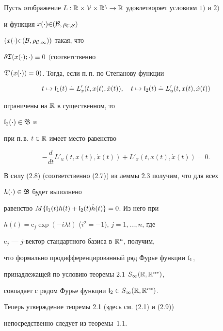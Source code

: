 \begin{thms}


Пусть отображение $L:\Bbb R\times\cal V\times\Bbb R^n


\to\Bbb R$ удовлетворяет условиям $1)$ и $2)$ 


и функция $x(\cdot){\in}(\cal B,\rho_{C,S})$


$(x(\cdot){\in}(\cal B,\rho_{C,\infty}))$ такая, что


$\delta\frak T(x(\cdot);\cdot)\equiv 0$ $($соответственно


$\frak T'(x(\cdot))=0)$. Тогда, если п.\,п. по Степанову функции


\begin{equation}


t\mapsto\frak l_1(t)\doteq L'_x(t, x(t),\Dot x(t)),


\quad t\mapsto\frak l_2(t)\doteq L'_u(t, x(t),\Dot x(t))


\end{equation}


ограничены на $\Bbb R$ в существенном, то


$\frak l_2(\cdot)\in\frak B$ и


при п.\,в. $t\in\Bbb R$ имеет место равенство


\begin{equation}


-\frac{d}{dt}L'_u(t, x(t),\Dot x(t))+L'_x(t,x(t),\dot x(t))=0.


\end{equation}


\end{thms}





\begin{pf}


В силу (2.8) (соответственно (2.7)) из леммы 2.3 получим, что для всех


$h(\cdot)\in\frak B$ будет выполнено


равенство $M\{\frak l_1(t)h(t)+\frak l_2(t)\Dot h(t)\}=0$. Из него при


$h(t)=\mathrm e_j\exp(-i\lambda t)$ ($i^2=-1$), $j=1,\dotsc,n$, где


$\mathrm e_j$ --- $j$-вектор стандартного базиса в $\Bbb R^n$, получим,


что формально продифференцированный ряд Фурье функции $\frak l_1$,


принадлежащей по условию теоремы 2.1 $S_{\infty}({\Bbb R},\Bbb R^{n*})$,


совпадает с рядом Фурье функции $\frak l_2\in


S_{\infty}(\Bbb R,\Bbb R^{n*})$.


Теперь утверждение теоремы 2.1 (здесь см. (2.1) и (2.9))


непосредственно следует из теоремы~1.1.


\end{pf}





